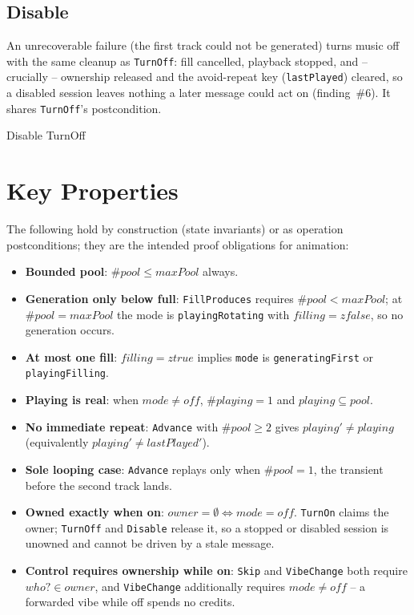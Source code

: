 \documentclass[a4paper,10pt,fleqn]{article}
\begin{document}
\subsection{Disable}

An unrecoverable failure (the first track could not be generated) turns
music off with the same cleanup as \texttt{TurnOff}: fill cancelled,
playback stopped, and -- crucially -- ownership released and the
avoid-repeat key (\texttt{lastPlayed}) cleared, so a disabled session
leaves nothing a later message could act on (finding~\#6). It shares
\texttt{TurnOff}'s postcondition.

\begin{zed}
  Disable  TurnOff
\end{zed}

\section{Key Properties}

The following hold by construction (state invariants) or as operation
postconditions; they are the intended proof obligations for animation:

\begin{itemize}
  \item \textbf{Bounded pool}: $\# pool \leq maxPool$ always.
  \item \textbf{Generation only below full}: \texttt{FillProduces} requires
    $\# pool < maxPool$; at $\# pool = maxPool$ the mode is
    \texttt{playingRotating} with $filling = zfalse$, so no generation
    occurs.
  \item \textbf{At most one fill}: $filling = ztrue$ implies
    \texttt{mode} is \texttt{generatingFirst} or \texttt{playingFilling}.
  \item \textbf{Playing is real}: when $mode \neq off$, $\# playing = 1$
    and $playing \subseteq pool$.
  \item \textbf{No immediate repeat}: \texttt{Advance} with $\# pool \geq 2$
    gives $playing' \neq playing$ (equivalently $playing' \neq
    lastPlayed'$).
  \item \textbf{Sole looping case}: \texttt{Advance} replays only when
    $\# pool = 1$, the transient before the second track lands.
  \item \textbf{Owned exactly when on}: $owner = \emptyset \iff mode =
    off$. \texttt{TurnOn} claims the owner; \texttt{TurnOff} and
    \texttt{Disable} release it, so a stopped or disabled session is
    unowned and cannot be driven by a stale message.
  \item \textbf{Control requires ownership while on}: \texttt{Skip} and
    \texttt{VibeChange} both require $who? \in owner$, and
    \texttt{VibeChange} additionally requires $mode \neq off$ -- a
    forwarded vibe while off spends no credits.
\end{itemize}
\end{document}
